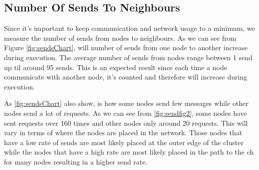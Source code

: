 \documentclass[USenglish]{uit-thesis}
\begin{document}
\newpage 

\subsection{Number Of Sends To Neighbours}
Since it's important to keep communication and network usage to a minimum, we measure the number of sends from nodes to neighbours. 
As we can see from Figure \ref{fig:sendsChart}, will number of sends from one node to another increase during execution. The average number of sends from nodes range between 1 send up til around 95 sends. This is an expected result since each time a node communicate with another node, it's counted and therefore will increase during execution.

As \autoref{fig:sendsChart} also show, is how some nodes send few messages while other nodes send a lot of requests. As we can see from \autoref{fig:sendfig2}, some nodes have sent requests over 160 times and other nodes only around 20 requests. This will vary in terms of where the nodes are placed in the network. Those nodes that have a low rate of sends are most likely placed at the outer edge of the cluster while the nodes that have a high rate are most likely placed in the path to the \gls{ch} for many nodes resulting in a higher send rate.


\end{document}
